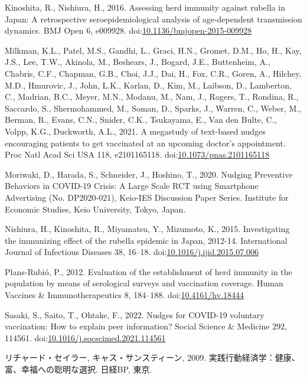 \documentclass[
  11pt,
  a4paper,
]{article}
\newlength{\cslhangindent}
\newlength{\cslentryspacingunit} %
\newenvironment{CSLReferences}[2] %
 {%
  \setlength{\parindent}{0pt}
  \ifodd #1
  \let\oldpar\par
  \def\par{\hangindent=\cslhangindent\oldpar}
  \fi
  \setlength{\parskip}{#2\cslentryspacingunit}
 }%
 {}
\begin{document}
\begin{CSLReferences}{1}{0}
\leavevmode{}%
Kinoshita, R., Nishiura, H., 2016. Assessing herd immunity against rubella in {Japan}: A retrospective seroepidemiological analysis of age-dependent transmission dynamics. BMJ Open 6, e009928. doi:\href{https://doi.org/10.1136/bmjopen-2015-009928}{10.1136/bmjopen-2015-009928}

\leavevmode{}%
Milkman, K.L., Patel, M.S., Gandhi, L., Graci, H.N., Gromet, D.M., Ho, H., Kay, J.S., Lee, T.W., Akinola, M., Beshears, J., Bogard, J.E., Buttenheim, A., Chabris, C.F., Chapman, G.B., Choi, J.J., Dai, H., Fox, C.R., Goren, A., Hilchey, M.D., Hmurovic, J., John, L.K., Karlan, D., Kim, M., Laibson, D., Lamberton, C., Madrian, B.C., Meyer, M.N., Modanu, M., Nam, J., Rogers, T., Rondina, R., Saccardo, S., Shermohammed, M., Soman, D., Sparks, J., Warren, C., Weber, M., Berman, R., Evans, C.N., Snider, C.K., Tsukayama, E., Van den Bulte, C., Volpp, K.G., Duckworth, A.L., 2021. A megastudy of text-based nudges encouraging patients to get vaccinated at an upcoming doctor's appointment. Proc Natl Acad Sci USA 118, e2101165118. doi:\href{https://doi.org/10.1073/pnas.2101165118}{10.1073/pnas.2101165118}

\leavevmode{}%
Moriwaki, D., Harada, S., Schneider, J., Hoshino, T., 2020. Nudging Preventive Behaviors in COVID-19 Crisis: A Large Scale RCT using Smartphone Advertising (No. DP2020-021), Keio-IES Discussion Paper Series. {Institute for Economic Studies, Keio University}, {Tokyo, Japan}.

\leavevmode{}%
Nishiura, H., Kinoshita, R., Miyamatsu, Y., Mizumoto, K., 2015. Investigating the immunizing effect of the rubella epidemic in {Japan}, 2012-14. International Journal of Infectious Diseases 38, 16--18. doi:\href{https://doi.org/10.1016/j.ijid.2015.07.006}{10.1016/j.ijid.2015.07.006}

\leavevmode{}%
Plans-Rubió, P., 2012. Evaluation of the establishment of herd immunity in the population by means of serological surveys and vaccination coverage. Human Vaccines \& Immunotherapeutics 8, 184--188. doi:\href{https://doi.org/10.4161/hv.18444}{10.4161/hv.18444}

\leavevmode{}%
Sasaki, S., Saito, T., Ohtake, F., 2022. Nudges for {COVID-19} voluntary vaccination: {How} to explain peer information? Social Science \& Medicine 292, 114561. doi:\href{https://doi.org/10.1016/j.socscimed.2021.114561}{10.1016/j.socscimed.2021.114561}

\leavevmode{}%
リチャード・セイラー, キャス・サンスティーン, 2009. 実践行動経済学：健康、富、幸福への聡明な選択. {日経BP}, {東京}.

\end{CSLReferences}
\end{document}
